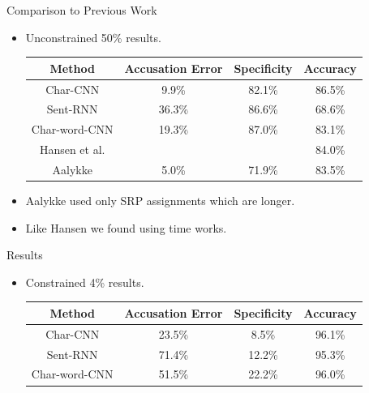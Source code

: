 \documentclass[10pt]{beamer}
\begin{document}
\begin{frame}[fragile]{Comparison to Previous Work}
    \begin{itemize}
        \item Unconstrained 50\% results.
            \begin{center}
                \begin{tabular}{c|ccc}
                    \textbf{Method}      & \textbf{Accusation Error} &
                    \textbf{Specificity} & \textbf{Accuracy}
                    \\ \hline
                    Char-CNN             & 9.9\%                     &
                    82.1\%               & 86.5\%
                    \\
                    Sent-RNN             & 36.3\%                    &
                    86.6\%               & 68.6\%
                    \\
                    Char-word-CNN        & 19.3\%                    &
                    87.0\%               & 83.1\%
                    \\
                    Hansen et al.        &                           &
                                         & 84.0\%
                    \\
                    Aalykke              & 5.0\%                     &
                    71.9\%               & 83.5\%
                    \\
                \end{tabular}
            \end{center}
        \item Aalykke used only SRP assignments which are longer.
        \item Like Hansen we found using time works.
    \end{itemize}
\end{frame}

\begin{frame}[fragile]{Results}
    \begin{itemize}
        \item Constrained 4\% results.
            \begin{center}
                \begin{tabular}{c|ccc}
                    \textbf{Method}      & \textbf{Accusation Error} &
                    \textbf{Specificity} & \textbf{Accuracy}
                    \\ \hline
                    Char-CNN             & 23.5\%                    &
                    8.5\%                & 96.1\%
                    \\
                    Sent-RNN             & 71.4\%                    &
                    12.2\%               & 95.3\%
                    \\
                    Char-word-CNN        & 51.5\%                    &
                    22.2\%               & 96.0\%
                \end{tabular}
            \end{center}
    \end{itemize}
\end{frame}
\end{document}
